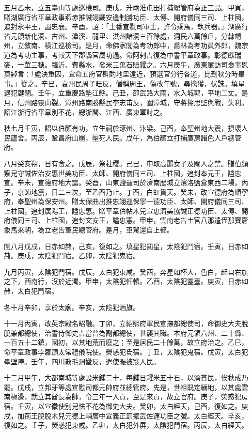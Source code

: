 \begin{pinyinscope}
 五月乙未，立五臺山等處巡檢司。庚戌，升兩淮屯田打捕總管府為正三品。甲寅，贈湖廣行省平章政事燕赤推誠翊戴安邊制勝功臣、太傅、開府儀同三司、上柱國，追封永平王，謚忠襄。辛酉，詔：「土番宣慰司軍士，許令乘馬，執兵器。」湖廣行省元領新化洞、古州、潭溪、龍里、洪州諸洞三百餘處，洞民六萬餘戶，分隸靖州，立敘南、橫江巡檢司。是月，命佛家閭為考功郎中，喬林為考功員外郎，魏宗道為考功主事，考較天下郡縣官屬功過。命阿剌吉復為中書平章政事。彰德獻瑞麥，一莖三穗。臨沂、費縣水，發米三萬石賑糶之。六月庚午，廣東廉訪司僉事恩莫綽言：「處決重囚，宜命五府官斟酌地里遠近，預選官分行各道，比到秋分時畢事。」從之。辛巳，袁州民周子旺反，僭稱周王，偽改年號，尋擒獲，伏誅。填星退犯鍵閉。壬午，立重慶路墊江縣。己丑，邵武路大雨，水入城郭，平地二丈。是月，信州路靈山裂。漳州路南勝縣民李志甫反，圍漳城，守將搠思監與戰，失利。詔江浙行省平章別不花，總浙閩、江西、廣東軍討之。



 秋七月壬寅，詔以伯顏有功，立生祠於涿州、汴梁。己酉，奉聖州地大震，損壞人民廬舍。丙辰，鞏昌府山崩，壓死人民。戊午，為伯顏立打捕鷹房諸色人戶總管府。



 八月癸亥朔，日有食之。戊辰，祭社稷。己巳，申取高麗女子及閹人之禁。贈伯顏察兒守誠佐治安惠世美功臣、太師、開府儀同三司、上柱國，追封奉元王，謚忠宣。辛未，宣德府地大震。癸酉，山東鹽運司於濟南歷城立濱洛鹽倉東西二場。丙子，京師地震，日二三次，至乙酉乃止。丁酉，白虹貫天。癸未，改宣德府為順寧府，奉聖州為保安州。贈太保曲出推忠翊運保寧一德功臣、太師、開府儀同三司、上柱國，追封廣陽王，謚忠惠。贈平章伯帖木兒宣忠濟美協誠正德功臣、太傅、開府儀同三司、上柱國，追封文安王，謚忠憲。甲申，雲南老告土官八那遣侄那賽齎象馬來朝，為立老告軍民總管府。是月，車駕還自上都。



 閏八月戊戌，日赤如赭，己亥，復如之。填星犯罰星，太陰犯鬥宿。壬寅，日赤如赭。庚戌，太陰犯鬥宿。乙卯，太陰犯鬼宿。



 九月丙寅，太陰犯鬥宿。戊辰，太白犯東咸。癸酉，奔星如杯大，色白，起自右旗之下，西南行，沒於近濁。甲申，太陰犯軒轅。乙酉，太陰犯靈臺。庚寅，日赤如赭，太白犯鬥宿。



 冬十月辛卯，享於太廟。辛亥，太陰犯酒旗。



 十一月丙寅，改英宗殿名昭融。丁卯，立紹熙府軍民宣撫都總使司，命御史大夫脫脫兼都總使，治書侍御史吉當普為副都總使，世襲其職。本府元領六州、二十縣、一百五十二鎮，國初，以其地荒而廢之；至是居民二十餘萬，故立府治之。乙巳，命平章政事孛羅領太常禮儀院使。熒惑犯氐宿。丁丑，太陰犯鬼宿。戊寅，太白犯壘壁陣。壬午，四川散毛洞蠻反，遣使賑被寇人民。



 十二月甲午，大都南城等處設米鋪二十，每鋪日糶米五十石，以濟貧民，俟秋成乃罷。戊戌，立邦牙等處宣慰司都元帥府並總管府。先是，世祖既定緬地，以其處雲南極邊，就立其酋長為帥，令三年一入貢，至是來貢，故立官府。庚子，熒惑犯房宿。壬寅，以宣徽使別兒怯不花為御史大夫。癸卯，太白經天，己酉，復如之。庚戌，加荊王脫脫木兒元德上輔廣中宣義正節振武佐運功臣之號。太白經天。辛亥，復如之。壬子，熒惑犯東咸。乙卯，太白犯外屏，太陰犯鬥宿。丙辰，太白經天。



\end{pinyinscope}